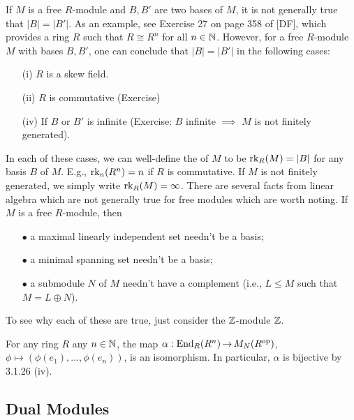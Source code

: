 \documentclass[11pt]{book}
\theoremstyle{definition}   \newtheorem{defn}[counter]{Definition} %
\DeclareMathOperator{\ra}{\rightarrow}   \DeclareMathOperator{\Poly}{\mathbf{P}}   \DeclareMathOperator{\spn}{\textnormal{span}}   \DeclareMathOperator{\aut}{\textnormal{Aut}}
\newcommand{\vs}{\vspace{8pt}}
\numberwithin{counter}{chapter}
\begin{document}
\begin{remark}
If $M$ is a free $R$-module and $B,B'$ are two bases of $M$, it is not generally true that $|B| = |B'|$. As an example, see Exercise 27 on page 358 of [DF], which provides a ring $R$ such that $R \cong R^n$ for all $n \in \operatorname{\mathbb{N}}$. However, for a free $R$-module $M$ with bases $B,B'$, one can conclude that $|B| = |B'|$ in the following cases:
\begin{enumerate}
\item[(i)] $R$ is a skew field.
\item[(ii)] $R$ is commutative (Exercise)
\item[(iv)] If $B$ or $B'$ is infinite (Exercise: $B$ infinite $\implies$ $M$ is not finitely generated). 
\end{enumerate}

In each of these cases, we can well-define the  of $M$ to be $\textnormal{rk}_R(M) = |B|$ for any basis $B$ of $M$. E.g., $\textnormal{rk}_n(R^n) = n$ if $R$ is commutative. If $M$ is not finitely generated, we simply write $\textnormal{rk}_R(M) = \infty$. There are several facts from linear algebra which are not generally true for free modules which are worth noting. If $M$ is a free $R$-module, then
\begin{enumerate}
\item[$\bullet$] a maximal linearly independent set needn't be a basis;
\item[$\bullet$] a minimal spanning set needn't be a basis;
\item[$\bullet$] a submodule $N$ of $M$ needn't have a complement (i.e., $L \leq M$ such that $M = L \oplus N$).
\end{enumerate}

To see why each of these are true, just consider the $\operatorname{\mathbb{Z}}$-module $\operatorname{\mathbb{Z}}$.
\end{remark}

\vs

\begin{example}
For any ring $R$ any $n \in \operatorname{\mathbb{N}}$, the map $\alpha : \tn{End}_R(R^n) \ra M_N(R\op)$, $\phi \mapsto (\phi(e_1),\dots,\phi(e_n))$, is an isomorphism. In particular, $\alpha$ is bijective by 3.1.26 (iv). 
\end{example}

\vs

\subsection*{Dual Modules}
\end{document}
